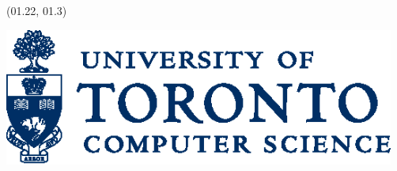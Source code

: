 \documentclass{article}
\def\LHead#1{\noindent{\LARGE\color{DarkBlue} #1}\bigskip}
\renewcommand{\LARGE}{\fontsize{43}{54}\selectfont}
\begin{document}


\begin{textblock}{8}(01.22, 01.3)
\begin{center}
\includegraphics[height=4.5cm]{dcs_logo.eps}
\end{center}
\end{textblock}












\end{document}
